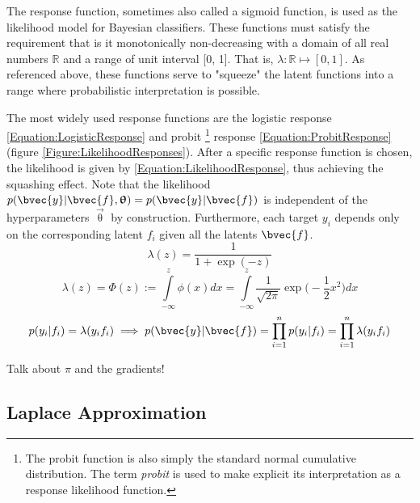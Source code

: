			The response function, sometimes also called a sigmoid function, is used as the likelihood model for Bayesian classifiers. These functions must satisfy the requirement that is it monotonically non-decreasing with a domain of all real numbers $\mathbb{R}$ and a range of unit interval [0, 1]. That is, $\lambda: \mathbb{R} \mapsto [0, 1]$. As referenced above, these functions serve to "squeeze" the latent functions into a range where probabilistic interpretation is possible.
				
			The most widely used response functions are the logistic response \eqref{Equation:LogisticResponse} and probit \footnote{The probit function is also simply the standard normal cumulative distribution. The term \textit{probit} is used to make explicit its interpretation as a response likelihood function.} response \eqref{Equation:ProbitResponse} (figure \ref{Figure:LikelihoodResponses}). After a specific response function is chosen, the likelihood is given by \eqref{Equation:LikelihoodResponse}, thus achieving the squashing effect. Note that the likelihood $p(\bvec{y} | \bvec{f}, \vec{\uptheta}) = p(\bvec{y} | \bvec{f})$ is independent of the hyperparameters $\vec{\uptheta}$ by construction. Furthermore, each target $y_{i}$ depends only on the corresponding latent $f_{i}$ given all the latents $\bvec{f}$. \begin{equation}
				\lambda(z) = \frac{1}{1 + \exp(-z)}
			\label{Equation:LogisticResponse}
			\end{equation} \begin{equation}
				\lambda(z) = \Phi(z) := \int\limits_{-\infty}^{z} \phi(x) dx =  \int\limits_{-\infty}^{z} \frac{1}{\sqrt{2 \pi}} \exp\Big(- \frac{1}{2} x^{2}\Big) dx
			\label{Equation:ProbitResponse}
			\end{equation} \begin{equation}
				p(y_{i} | f_{i}) = \lambda(y_{i} f_{i}) \implies p(\bvec{y} | \bvec{f}) = \prod_{i = 1}^{n} p(y_{i} | f_{i}) = \prod_{i = 1}^{n} \lambda(y_{i} f_{i})
			\label{Equation:LikelihoodResponse}
			\end{equation}				
			\FloatBarrier
			
			Talk about $\pi$ and the gradients!
			
		\subsection{Laplace Approximation}
		\label{BenthicHabitatMapping:Classification:LaplaceApproximation}
		

